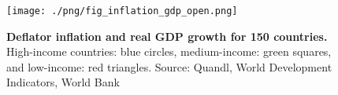 \begin{figure}[h]
\caption{\label{fig:inflation_gdp_open} \textbf{Deflator inflation and real GDP growth for 150 countries.} High-income countries: blue circles, medium-income: green squares, and low-income: red triangles. {\tiny Source: Quandl, World Development Indicators, World Bank}}
\hspace*{-.5cm}\texttt{[image: ./png/fig\_inflation\_gdp\_open.png]}
\end{figure}